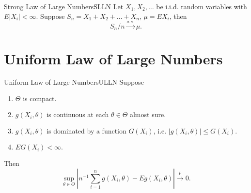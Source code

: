 \begin{theorem}{Strong Law of Large Numbers}{SLLN}
    Let $X_1,X_2,\ldots$ be i.i.d. random variables with $E|X_i|<\infty$. Suppose $S_n=X_1+X_2+\ldots+X_n$, $\mu=EX_i$, then
    \begin{equation}
        S_n/n\stackrel{a.s.}{\rightarrow}\mu.
    \end{equation}
\end{theorem}

\section{Uniform Law of Large Numbers}

\begin{theorem}{Uniform Law of Large Numbers}{ULLN}
    Suppose
    \begin{enumerate}
        \item $\Theta$ is compact.
        \item $g\left(X_{i},\theta\right)$ is continuous at each $\theta\in\Theta$ almost sure.
        \item $g\left(X_{i},\theta\right)$ is dominated by a function $G\left(X_{i}\right)$, i.e. $\left|g\left(X_{i},\theta\right)\right|\leq G\left(X_{i}\right)$.
        \item $EG\left(X_{i}\right)<\infty$.
    \end{enumerate}
    Then
    \begin{equation}
        \sup_{\theta\in\Theta}\left|n^{-1}\sum_{i=1}^{n}g\left(X_{i},\theta\right)-Eg\left(X_{i},\theta\right)\right|\stackrel{p}{\rightarrow}0.
    \end{equation}
\end{theorem}

